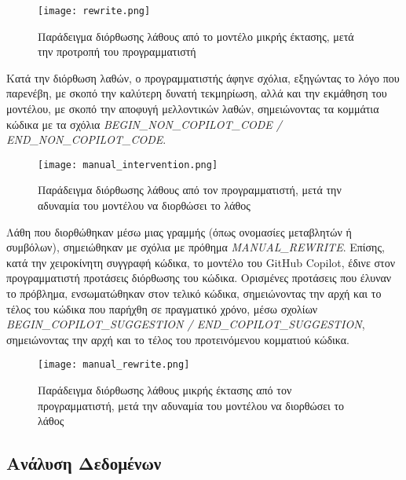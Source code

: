 \begin{figure}[H]
  \begin{center}
    \texttt{[image: rewrite.png]}
    \label{fig:rewrite}
    \caption{Παράδειγμα διόρθωσης λάθους από το μοντέλο μικρής έκτασης,
      μετά την προτροπή του προγραμματιστή}
  \end{center}
\end{figure}

Κατά την διόρθωση λαθών, ο προγραμματιστής άφηνε σχόλια, εξηγώντας το
λόγο που παρενέβη, με σκοπό την καλύτερη δυνατή τεκμηρίωση, αλλά και την
εκμάθηση του μοντέλου, με σκοπό την αποφυγή μελλοντικών λαθών,
σημειώνοντας τα κομμάτια κώδικα με τα σχόλια
\textlatin{\textit{BEGIN\_NON\_COPILOT\_CODE /
    END\_NON\_COPILOT\_CODE}}.

\begin{figure}[H]
  \begin{center}
    \texttt{[image: manual\_intervention.png]}
    \label{fig:nonCopilotCode}
    \caption{Παράδειγμα διόρθωσης λάθους από τον προγραμματιστή, μετά
      την αδυναμία του μοντέλου να διορθώσει το λάθος}
  \end{center}
\end{figure}

Λάθη που διορθώθηκαν μέσω μιας γραμμής (όπως ονομασίες μεταβλητών ή
συμβόλων), σημειώθηκαν με σχόλια με πρόθημα
\textlatin{\textit{MANUAL\_REWRITE}}. Επίσης, κατά την χειροκίνητη
συγγραφή κώδικα, το μοντέλο του \textlatin{GitHub Copilot}, έδινε στον
προγραμματιστή προτάσεις διόρθωσης του κώδικα. Ορισμένες προτάσεις που
έλυναν το πρόβλημα, ενσωματώθηκαν στον τελικό κώδικα, σημειώνοντας την
αρχή και το τέλος του κώδικα που παρήχθη σε πραγματικό χρόνο, μέσω
σχολίων \textlatin{\textit{BEGIN\_COPILOT\_SUGGESTION /
    END\_COPILOT\_SUGGESTION}}, σημειώνοντας την αρχή και το τέλος του
προτεινόμενου κομματιού κώδικα.

\begin{figure}[H]
  \begin{center}
    \texttt{[image: manual\_rewrite.png]}
    \label{fig:manualRewrite}
    \caption{Παράδειγμα διόρθωσης λάθους μικρής έκτασης από τον
      προγραμματιστή, μετά την αδυναμία του μοντέλου να διορθώσει το
      λάθος}
  \end{center}
\end{figure}

\subsection{Ανάλυση Δεδομένων}

